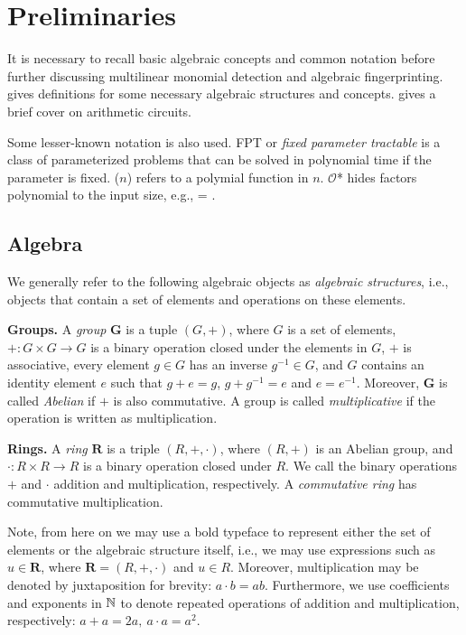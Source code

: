 \section{Preliminaries}
\label{sect:prelims}

It is necessary to recall basic algebraic concepts and common notation 
before further discussing multilinear monomial detection and algebraic fingerprinting. 
 gives definitions for some necessary algebraic structures 
and concepts.  gives a brief cover on arithmetic circuits. 

Some lesser-known notation is also used. FPT or \emph{fixed parameter tractable} 
is a class of parameterized problems that 
can be solved in polynomial time if the parameter is fixed. 
\poly($n$) refers to a polymial function in $n$. 
$\mathcal O$* hides factors polynomial to the input size, e.g., 
 = .

\subsection{Algebra} 
\label{sect:prelims_algebra}

We generally refer to the following algebraic objects 
as \emph{algebraic structures}, i.e., objects that contain a 
set of elements and operations on these elements.

\textbf{Groups.} A \emph{group} $\mathbf G$
is a tuple $(G, +)$, where $G$ is a set of elements, 
$+ \colon G \times G \to G$ 
is a binary operation closed under 
the elements in $G$, $+$ is associative, every element $g \in G$ 
has an inverse $g^{-1}\in G$, and $G$ contains 
an identity element $e$ such that $g + e = g$, $g + g^{-1} = e$ and $e = e^{-1}$. 
Moreover, $\mathbf G$ is called \emph{Abelian} if 
$+$ is also commutative. A group is called \emph{multiplicative} if the operation 
is written as multiplication.

\textbf{Rings.} A \emph{ring} $\mathbf R$ is a triple $(R,+,\cdot)$, 
where $(R, +)$ is an Abelian group, and $\cdot \colon R \times R \to R$ 
is a binary operation closed under $R$. We call the binary operations $+$ and $\cdot$ 
addition and multiplication, respectively. A \emph{commutative ring} has commutative multiplication. 

Note, from here on we may use a bold typeface to represent either the set of elements 
or the algebraic structure itself, i.e., 
we may use expressions such as $u \in \mathbf{R}$, where $\mathbf{R} = (R,+,\cdot)$ and $u \in R$. 
Moreover, multiplication may be denoted by juxtaposition for brevity: $a \cdot b = ab$. 
Furthermore, we use coefficients and exponents in $\mathbb N$ to denote repeated operations of 
addition and multiplication, respectively: $a+a = 2a, \: a \cdot a=a^2$.


